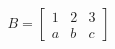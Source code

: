 \documentclass[preview]{standalone}
\begin{document}
\begin{align*}
B = \begin{bmatrix}
                        1 & 2 & 3\\
                        a & b & c
                    \end{bmatrix}
\end{align*}
\end{document}
